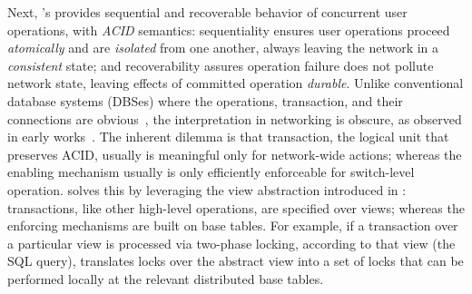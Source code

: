 Next, \Sys's \TR provides sequential and recoverable behavior of
concurrent user operations, with \textit{ACID} semantics:
sequentiality ensures user operations proceed \textit{atomically} and
are \textit{isolated} from one another, always leaving the network in
a \textit{consistent} state; and recoverability assures operation
failure does not pollute network state, leaving effects of committed
operation \textit{durable}. Unlike conventional database systems (DBSes)
where the operations, transaction, and their connections are
obvious~\cite{Bernstein:concurrency-recovery,concurrency-recovery-alg,principles-tp,concurrency-ddb},
the interpretation in networking is obscure, as observed in early
works~\cite{hotsdn-transactional-networking,On-Consistent-Updates,of-cpp}.
The inherent dilemma is that transaction, the logical unit that
preserves ACID, usually is meaningful only for network-wide actions;
whereas the enabling mechanism usually is only efficiently enforceable
for switch-level operation. \TTR solves this by leveraging the view
abstraction introduced in \TI: transactions, like other high-level
operations, are specified over views; whereas the enforcing mechanisms
are built on base tables.
For example, if a transaction over a particular view is processed via
two-phase locking, according to that view (the SQL query), \Sys
translates locks over the abstract view into a set of locks that can
be performed locally at the relevant distributed base tables.




